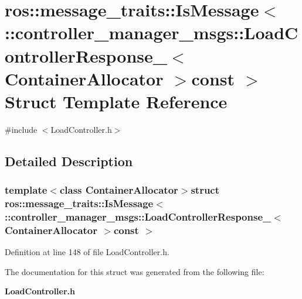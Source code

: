 \section{ros\-:\-:message\-\_\-traits\-:\-:\-Is\-Message$<$ \-:\-:controller\-\_\-manager\-\_\-msgs\-:\-:\-Load\-Controller\-Response\-\_\-$<$ \-Container\-Allocator $>$const $>$ \-Struct \-Template \-Reference}
\label{structros_1_1message__traits_1_1IsMessage_3_01_1_1controller__manager__msgs_1_1LoadControllerResb4a8e3c08ffb5dfac49ee46a434a353b}


{\ttfamily \#include $<$\-Load\-Controller.\-h$>$}



\subsection{\-Detailed \-Description}
\subsubsection*{template$<$class Container\-Allocator$>$struct ros\-::message\-\_\-traits\-::\-Is\-Message$<$ \-::controller\-\_\-manager\-\_\-msgs\-::\-Load\-Controller\-Response\-\_\-$<$ Container\-Allocator $>$const  $>$}



\-Definition at line 148 of file \-Load\-Controller.\-h.



\-The documentation for this struct was generated from the following file\-:\begin{DoxyCompactItemize}
\item 
{\bf \-Load\-Controller.\-h}\end{DoxyCompactItemize}
